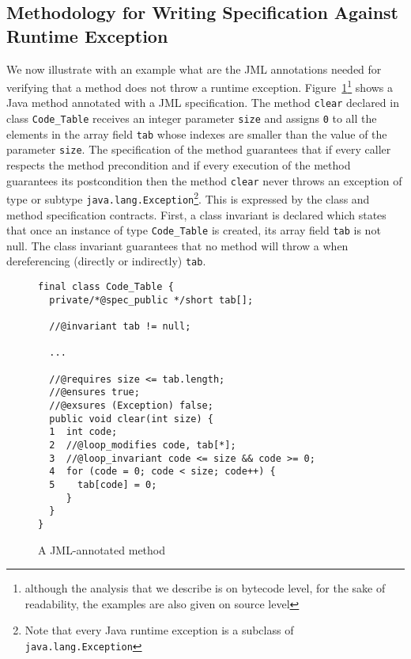 


\subsection{Methodology for Writing Specification Against Runtime Exception}

We now illustrate with an example what are the JML annotations needed 
for verifying that a method does not throw  a runtime exception.
 Figure~\ref{fig:jmlexample}\footnote{although the analysis that we describe is on bytecode level, for the sake of readability, the examples are also given on source level}
 shows a Java method annotated with a JML specification. The method \verb!clear! declared in class \verb!Code_Table! receives an integer parameter \verb!size! and assigns \verb!0! to all the elements in the array field \verb!tab! whose indexes are smaller than the value of the parameter \verb!size!. The specification of the method guarantees that if every caller respects the method precondition and if every execution of the method guarantees its postcondition then the method \verb!clear! never throws an exception of type or subtype \verb!java.lang.Exception!\footnote{Note that every Java runtime exception is a subclass of \texttt{java.lang.Exception}}. This is expressed by the class and method specification contracts.
First, a class invariant is declared which states that once an instance of type \verb!Code_Table! is created, its array field \verb!tab! is not null. The class invariant guarantees that no method will throw a \NullPointerExc{} when dereferencing (directly or indirectly) \verb!tab!.

\begin{figure}
\begin{verbatim}
final class Code_Table {
  private/*@spec_public */short tab[];

  //@invariant tab != null;

  ...

  //@requires size <= tab.length;
  //@ensures true;
  //@exsures (Exception) false;
  public void clear(int size) {
  1  int code;
  2  //@loop_modifies code, tab[*];
  3  //@loop_invariant code <= size && code >= 0;
  4  for (code = 0; code < size; code++) {
  5    tab[code] = 0;
     }
  }
}
\end{verbatim}

\caption{\sc A JML-annotated method}
\label{fig:jmlexample}
\end{figure}

